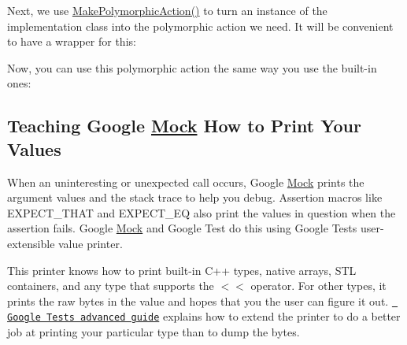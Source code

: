 Next, we use {\ttfamily \mbox{\hyperlink{namespacetesting_a45df529b8166936d970884383f0ede82}{Make\+Polymorphic\+Action()}}} to turn an instance of the implementation class into the polymorphic action we need. It will be convenient to have a wrapper for this\+:


\begin{DoxyCode}{0}
\DoxyCodeLine{}
\DoxyCodeLine{\}}
\end{DoxyCode}


Now, you can use this polymorphic action the same way you use the built-\/in ones\+:


\begin{DoxyCode}{0}
\DoxyCodeLine{}
\DoxyCodeLine{\};}
\DoxyCodeLine{}
\end{DoxyCode}


\subsection*{Teaching Google \mbox{\hyperlink{class_mock}{Mock}} How to Print Your Values}

When an uninteresting or unexpected call occurs, Google \mbox{\hyperlink{class_mock}{Mock}} prints the argument values and the stack trace to help you debug. Assertion macros like {\ttfamily E\+X\+P\+E\+C\+T\+\_\+\+T\+H\+AT} and {\ttfamily E\+X\+P\+E\+C\+T\+\_\+\+EQ} also print the values in question when the assertion fails. Google \mbox{\hyperlink{class_mock}{Mock}} and Google Test do this using Google Test\textquotesingle{}s user-\/extensible value printer.

This printer knows how to print built-\/in C++ types, native arrays, S\+TL containers, and any type that supports the {\ttfamily $<$$<$} operator. For other types, it prints the raw bytes in the value and hopes that you the user can figure it out. \href{../../googletest/docs/advanced.md\#teaching-google-test-how-to-print-your-values}{\texttt{ Google Test\textquotesingle{}s advanced guide}} explains how to extend the printer to do a better job at printing your particular type than to dump the bytes. 